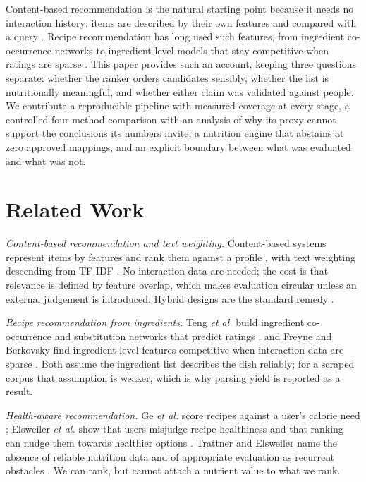 \documentclass[conference]{IEEEtran}
\begin{document}
Content-based recommendation is the natural starting point because it needs no interaction history: items are described by their own features and compared with a query \cite{pazzani2007}. Recipe recommendation has long used such features, from ingredient co-occurrence networks \cite{teng2012} to ingredient-level models that stay competitive when ratings are sparse \cite{freyne2010}. This paper provides such an account, keeping three questions separate: whether the ranker orders candidates sensibly, whether the list is nutritionally meaningful, and whether either claim was validated against people. We contribute a reproducible pipeline with measured coverage at every stage, a controlled four-method comparison with an analysis of why its proxy cannot support the conclusions its numbers invite, a nutrition engine that abstains at zero approved mappings, and an explicit boundary between what was evaluated and what was not.

\section{Related Work} \label{sec:related}

\emph{Content-based recommendation and text weighting.} Content-based systems represent items by features and rank them against a profile \cite{pazzani2007}, with text weighting descending from TF-IDF \cite{salton1988}. No interaction data are needed; the cost is that relevance is defined by feature overlap, which makes evaluation circular unless an external judgement is introduced. Hybrid designs are the standard remedy \cite{burke2002}.

\emph{Recipe recommendation from ingredients.} Teng \emph{et al.} build ingredient co-occurrence and substitution networks that predict ratings \cite{teng2012}, and Freyne and Berkovsky find ingredient-level features competitive when interaction data are sparse \cite{freyne2010}. Both assume the ingredient list describes the dish reliably; for a scraped corpus that assumption is weaker, which is why parsing yield is reported as a result.

\emph{Health-aware recommendation.} Ge \emph{et al.} score recipes against a user's calorie need \cite{ge2015}; Elsweiler \emph{et al.} show that users misjudge recipe healthiness and that ranking can nudge them towards healthier options \cite{elsweiler2017}. Trattner and Elsweiler name the absence of reliable nutrition data and of appropriate evaluation as recurrent obstacles \cite{trattner2017}. We can rank, but cannot attach a nutrient value to what we rank.
\end{document}
